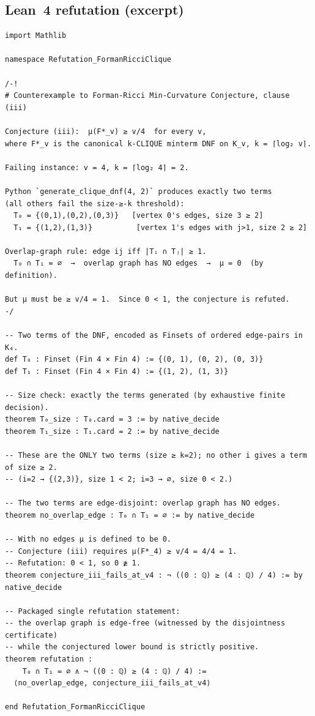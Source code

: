 \documentclass[11pt,a4paper]{article}
\begin{document}
\subsection*{Lean~4 refutation (excerpt)}
\begin{lstlisting}
import Mathlib

namespace Refutation_FormanRicciClique

/-!
# Counterexample to Forman-Ricci Min-Curvature Conjecture, clause (iii)

Conjecture (iii):  μ(F*_v) ≥ v/4  for every v,
where F*_v is the canonical k-CLIQUE minterm DNF on K_v, k = ⌈log₂ v⌉.

Failing instance: v = 4, k = ⌈log₂ 4⌉ = 2.

Python `generate_clique_dnf(4, 2)` produces exactly two terms
(all others fail the size-≥-k threshold):
  T₀ = {(0,1),(0,2),(0,3)}   [vertex 0's edges, size 3 ≥ 2]
  T₁ = {(1,2),(1,3)}          [vertex 1's edges with j>1, size 2 ≥ 2]

Overlap-graph rule: edge ij iff |Tᵢ ∩ Tⱼ| ≥ 1.
  T₀ ∩ T₁ = ∅  →  overlap graph has NO edges  →  μ = 0  (by definition).

But μ must be ≥ v/4 = 1.  Since 0 < 1, the conjecture is refuted.
-/

-- Two terms of the DNF, encoded as Finsets of ordered edge-pairs in K₄.
def T₀ : Finset (Fin 4 × Fin 4) := {(0, 1), (0, 2), (0, 3)}
def T₁ : Finset (Fin 4 × Fin 4) := {(1, 2), (1, 3)}

-- Size check: exactly the terms generated (by exhaustive finite decision).
theorem T₀_size : T₀.card = 3 := by native_decide
theorem T₁_size : T₁.card = 2 := by native_decide

-- These are the ONLY two terms (size ≥ k=2); no other i gives a term of size ≥ 2.
-- (i=2 → {(2,3)}, size 1 < 2; i=3 → ∅, size 0 < 2.)

-- The two terms are edge-disjoint: overlap graph has NO edges.
theorem no_overlap_edge : T₀ ∩ T₁ = ∅ := by native_decide

-- With no edges μ is defined to be 0.
-- Conjecture (iii) requires μ(F*_4) ≥ v/4 = 4/4 = 1.
-- Refutation: 0 < 1, so 0 ≱ 1.
theorem conjecture_iii_fails_at_v4 : ¬ ((0 : ℚ) ≥ (4 : ℚ) / 4) := by native_decide

-- Packaged single refutation statement:
-- the overlap graph is edge-free (witnessed by the disjointness certificate)
-- while the conjectured lower bound is strictly positive.
theorem refutation :
    T₀ ∩ T₁ = ∅ ∧ ¬ ((0 : ℚ) ≥ (4 : ℚ) / 4) :=
  ⟨no_overlap_edge, conjecture_iii_fails_at_v4⟩

end Refutation_FormanRicciClique
\end{lstlisting}
\end{document}
